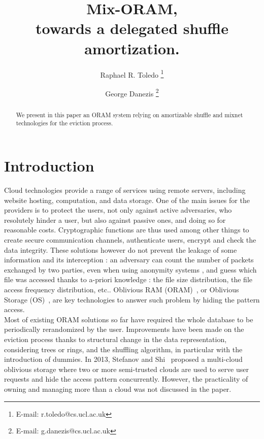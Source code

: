 \documentclass[a4paper]{article}
\begin{document}
\author{Raphael R. Toledo \thanks{E-mail: r.toledo@cs.ucl.ac.uk} }
\author{George Danezis \thanks{E-mail: g.danezis@cs.ucl.ac.uk} }


\title{Mix-ORAM,\\ towards a delegated shuffle amortization.}

\maketitle

\begin{abstract}
{
We present in this paper an ORAM system relying on amortizable shuffle and mixnet technologies for the eviction process.
}
\end{abstract}

\section{Introduction}
Cloud technologies provide a range of services using remote servers, including website hosting, computation, and data storage. One of the main issues for the providers is to protect the users, not only against active adversaries, who resolutely hinder a user, but also against passive ones, and doing so for reasonable costs. 
Cryptographic functions are thus used among other things to create secure communication channels, authenticate users, encrypt and check the data integrity. These solutions however do not prevent the leakage of some information and its interception : an adversary can count the number of packets exchanged by two parties, even when using anonymity systems \cite{murdoch2005}, and guess which file was accessed thanks to a-priori knowledge : the file size distribution, the file access frequency distribution, etc..
Oblivious RAM (ORAM)~\cite{goldreich87}, or Oblivious Storage (OS)~\cite{boneh2011}, are key technologies to answer such problem by hiding the pattern access.\\

Most of existing ORAM solutions so far have required the whole database to be periodically rerandomized by the user. Improvements have been made on the eviction process thanks to structural change in the data representation, considering trees or rings, and the shuffling algorithm, in particular with the introduction of dummies.
In 2013, Stefanov and Shi~\cite{stefanov2013} proposed a multi-cloud oblivious storage where two or more semi-trusted clouds are used to serve user requests and hide the access pattern concurrently. However, the practicality of owning and managing more than a cloud was not discussed in the paper. \\
\end{document}

